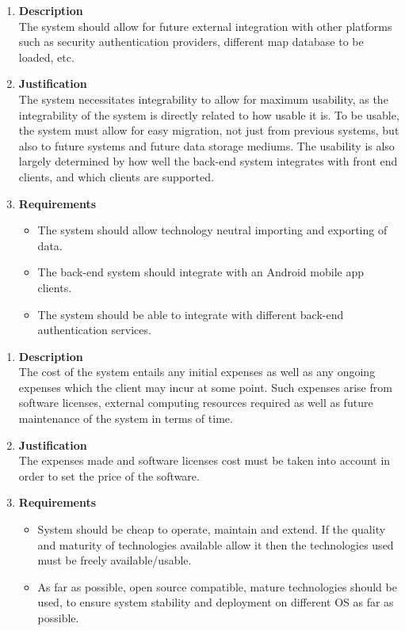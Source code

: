 \documentclass[a4paper,10pt]{article}
\begin{document}
\begin{enumerate}
\item \textbf{Description} \\
The system should allow for future external integration with other platforms such as security authentication providers, different map database to be loaded, etc.
\item \textbf{Justification} \\
The system necessitates integrability to allow for maximum usability, as the integrability of the system is directly related to how usable it is. To be usable, the system must allow for easy migration, not just from previous systems, but also to future systems and future data storage mediums. The usability is also largely determined by how well the back-end system integrates with front end clients, and which clients are supported.
\item \textbf{Requirements}
	\begin{itemize}
		\item The system should allow technology neutral importing and exporting of data.
		\item The back-end system should integrate with an Android mobile app clients.
		\item The system should be able to integrate with different back-end authentication services.
	\end{itemize}
\end{enumerate}
\begin{enumerate}
\item \textbf{Description} \\
The cost of the system entails any initial expenses as well as any ongoing expenses which the client may incur at some point. Such expenses arise from software licenses, external computing resources required as well as future maintenance of the system in terms of time.
\item \textbf{Justification} \\
The expenses made and software licenses cost must be taken into account in order to set the price of the software.
\item \textbf{Requirements}
	\begin{itemize}
		\item System should be cheap to operate, maintain and extend. If the quality and maturity of technologies available allow it then the technologies used must be freely available/usable.
		\item As far as possible, open source compatible, mature technologies should be used, to ensure system stability and deployment on different OS as far as possible.
	\end{itemize}
\end{enumerate}
\end{document}
